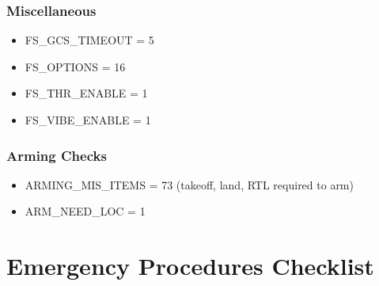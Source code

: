         \subsubsection{Miscellaneous} 
        \begin{itemize}
            \item FS\_GCS\_TIMEOUT = 5
            \item FS\_OPTIONS = 16
            \item FS\_THR\_ENABLE = 1
            \item FS\_VIBE\_ENABLE = 1
        \end{itemize}
        \subsubsection{Arming Checks} 
        \begin{itemize}
            \item ARMING\_MIS\_ITEMS = 73 (takeoff, land, RTL required to arm)
            \item ARM\_NEED\_LOC = 1
        \end{itemize}
            
\section{Emergency Procedures Checklist}\label{cl:emergencyprocedures}

